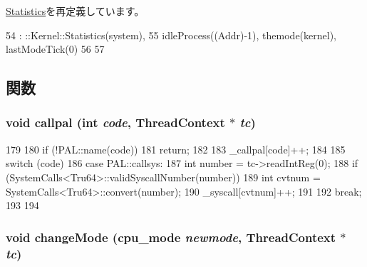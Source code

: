 \hyperlink{classKernel_1_1Statistics_a83aac6d65afe578fbf92b926ce7c1c3c}{Statistics}を再定義しています。


\begin{DoxyCode}
54     : ::Kernel::Statistics(system),
55       idleProcess((Addr)-1), themode(kernel), lastModeTick(0)
56 {
57 }
\end{DoxyCode}


\subsection{関数}
\hypertarget{classAlphaISA_1_1Kernel_1_1Statistics_a7827dc7da6357e12e4cd63cd4e2c4ae3}{
\subsubsection[{callpal}]{\setlength{\rightskip}{0pt plus 5cm}void callpal (int {\em code}, \/  {\bf ThreadContext} $\ast$ {\em tc})}}
\label{classAlphaISA_1_1Kernel_1_1Statistics_a7827dc7da6357e12e4cd63cd4e2c4ae3}



\begin{DoxyCode}
179 {
180     if (!PAL::name(code))
181         return;
182 
183     _callpal[code]++;
184 
185     switch (code) {
186       case PAL::callsys: {
187           int number = tc->readIntReg(0);
188           if (SystemCalls<Tru64>::validSyscallNumber(number)) {
189               int cvtnum = SystemCalls<Tru64>::convert(number);
190               _syscall[cvtnum]++;
191           }
192       } break;
193     }
194 }
\end{DoxyCode}
\hypertarget{classAlphaISA_1_1Kernel_1_1Statistics_a3b94b2c16465171d96e98013e647eb1f}{
\subsubsection[{changeMode}]{\setlength{\rightskip}{0pt plus 5cm}void changeMode ({\bf cpu\_\-mode} {\em newmode}, \/  {\bf ThreadContext} $\ast$ {\em tc})}}
\label{classAlphaISA_1_1Kernel_1_1Statistics_a3b94b2c16465171d96e98013e647eb1f}



